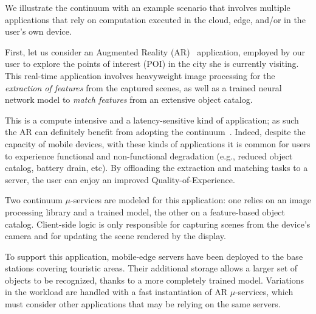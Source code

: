 

We illustrate the continuum with an example scenario that involves multiple applications that rely on computation executed in the cloud, edge, and/or in the user's own device.

First, let us consider an Augmented Reality (AR)~\cite{GarrigaMendonca2017} application, employed by our user to explore the points of interest (POI) in the city she is currently visiting. This real-time application involves heavyweight image processing for the \textit{extraction of features} from the captured scenes, as well as a trained neural network model to \textit{match features} from an extensive object catalog. 

This is a compute intensive and a latency-sensitive kind of application; as such the AR can definitely benefit from adopting the continuum~\cite{beck2014mobile}. Indeed, despite the capacity of mobile devices, with these kinds of applications it is common for users to experience functional and non-functional degradation (e.g., reduced object catalog, battery drain, etc). By offloading the extraction and matching tasks to a server, the user can enjoy an improved Quality-of-Experience.

Two continuum $\mu$-services are modeled for this application: one relies on an image processing library and a trained model, the other on a feature-based object catalog. Client-side logic is only responsible for capturing scenes from the device's camera and for updating the scene rendered by the display.


To support this application, mobile-edge servers have been deployed to the base stations covering touristic areas. Their additional storage allows a larger set of objects to be recognized, thanks to a more completely trained model. Variations in the workload are handled with a fast instantiation of AR $\mu$-services, which must consider other applications that may be relying on the same servers.

